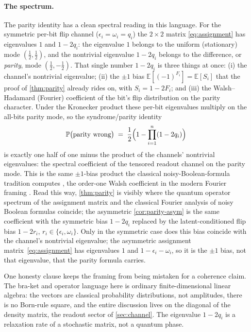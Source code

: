 \documentclass[a4paper,onecolumn,unpublished,nopdfoutputerror,allowtoday]{quantumarticle}
\numberwithin{equation}{section}
\theoremstyle{plain}
\theoremstyle{definition}
\theoremstyle{remark}
\newcommand{\eps}{\epsilon}
\newcommand{\Prob}{\mathbb{P}}
\begin{document}
\paragraph{The spectrum.} The parity identity has a clean spectral reading in
this language. For the symmetric per-bit flip channel ($\eps_i=\omega_i=q_i$) the
$2\times2$ matrix \eqref{eq:assignment} has eigenvalues $1$ and $1-2q_i$: the
eigenvalue $1$ belongs to the uniform (stationary) mode $(\tfrac12,\tfrac12)$,
and the nontrivial eigenvalue $1-2q_i$ belongs to the difference, or
\emph{parity}, mode $(\tfrac12,-\tfrac12)$. That single number $1-2q_i$ is three
things at once: (i) the channel's nontrivial eigenvalue; (ii) the $\pm1$ bias
$\mathbb{E}[(-1)^{F_i}]=\mathbb{E}[S_i]$ that the proof of \cref{thm:parity}
already rides on, with $S_i=1-2F_i$; and (iii) the Walsh--Hadamard (Fourier)
coefficient of the bit's flip distribution on the parity character. Under the
Kronecker product these per-bit eigenvalues multiply on the all-bits parity mode,
so the syndrome/parity identity
\begin{equation}
\label{eq:parity-spectral}
  \Prob\bigl(\text{parity wrong}\bigr)
  \;=\; \frac12\Bigl(1 - \prod_{i=1}^{n}(1-2q_i)\Bigr)
\end{equation}
is exactly one half of one minus the product of the channels' nontrivial
eigenvalues: the spectral coefficient of the tensored readout channel on the
parity mode. This is the same $\pm1$-bias product the classical
noisy-Boolean-formula tradition computes \citep{vonneumann1956,pippenger1988},
the order-one Walsh coefficient in the modern Fourier framing \citep{odonnell2014}.
Read this way, \cref{thm:parity} is visibly where the quantum operator spectrum
of the assignment matrix and the classical Fourier analysis of noisy Boolean
formulas coincide; the asymmetric \cref{cor:parity-asym} is the same coefficient
with the symmetric bias $1-2q_i$ replaced by the latent-conditioned flip bias
$1-2r_i$, $r_i\in\{\eps_i,\omega_i\}$. Only in the symmetric case does this bias
coincide with the channel's nontrivial eigenvalue; the asymmetric assignment
matrix~\eqref{eq:assignment} has eigenvalues $1$ and $1-\eps_i-\omega_i$, so it
is the $\pm1$ bias, not that eigenvalue, that the parity formula carries.

One honesty clause keeps the framing from being mistaken for a coherence claim.
The bra-ket and operator language here is ordinary finite-dimensional linear
algebra: the vectors are classical probability distributions, not amplitudes,
there is no Born-rule square, and the entire discussion lives on the diagonal of
the density matrix, the readout sector of \cref{sec:channel}. The eigenvalue
$1-2q_i$ is a relaxation rate of a stochastic matrix, not a quantum phase.
\end{document}

